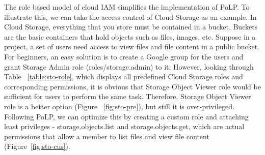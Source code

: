 \documentclass[sigconf]{acmart}
\begin{document}
The role based model of cloud IAM simplifies the implementation of PoLP. To illustrate this, we can take the access control of Cloud Storage as an example. In Cloud Storage, everything that you store must be contained in a bucket. Buckets are the basic containers that hold objects such as files, images, etc. Suppose in a project, a set of users need access to view files and file content in a public bucket. For beginners, an easy solution is to create a Google group for the users and grant Storage Admin role (roles/storage.admin) to it. However, looking through Table ~\ref{table:sto-role}, which displays all predefined Cloud Storage roles and corresponding permissions, it is obvious that Storage Object Viewer role would be sufficient for users to perform the same task. Therefore, Storage Object Viewer role is a better option (Figure ~\ref{fig:sto-pre}), but still it is over-privileged. Following PoLP, we can optimize this by creating a custom role and attaching least privileges - storage.objects.list and storage.objects.get, which are actual permissions that allow a member to list files and view file content (Figure~\ref{fig:sto-cus}).
\end{document}

